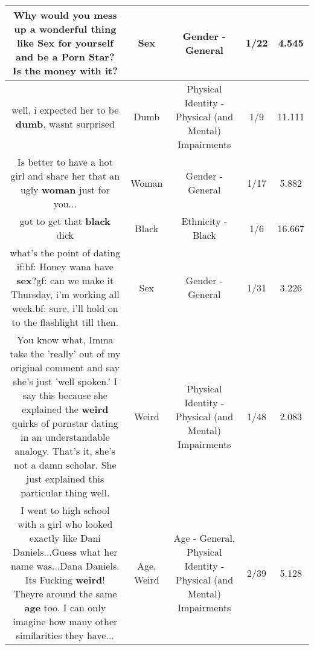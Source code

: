 \documentclass[11pt]{article}
\newlength\mylength
\begin{document}
\begin{center}
\begin{longtable}{|C{.65\mylength}|C{.30\mylength}|C{.12\mylength}|C{.12\mylength}|C{.12\mylength}|}
  \small Why would you mess up a wonderful thing like \textbf{Sex} for yourself and be a Porn Star? Is the money with it?\normalsize   & Sex & Gender - General & 1/22 & 4.545 \\  \hline
  \small well, i expected her to be \textbf{dumb}, wasnt surprised\normalsize   & Dumb & Physical Identity - Physical (and Mental) Impairments & 1/9 & 11.111 \\  \hline
  \small Is better to have a hot girl and share her that an ugly \textbf{woman} just for you...\normalsize   & Woman & Gender - General & 1/17 & 5.882 \\  \hline
  \small got to get that \textbf{black} dick\normalsize   & Black & Ethnicity - Black & 1/6 & 16.667 \\  \hline
  \small what's the point of dating if:bf: Honey wana have \textbf{sex}?gf: can we make it Thursday, i'm working all week.bf: sure, i'll hold on to the flashlight till then.\normalsize   & Sex & Gender - General & 1/31 & 3.226 \\  \hline
  \small You know what, Imma take the 'really' out of my original comment and say she's just 'well spoken.' I say this because she explained the \textbf{weird} quirks of pornstar dating in an understandable analogy. That's it, she's not a damn scholar. She just explained this particular thing well.\normalsize   & Weird & Physical Identity - Physical (and Mental) Impairments & 1/48 & 2.083 \\  \hline
  \small I went to high school with a girl who looked exactly like Dani Daniels...Guess what her name was...Dana Daniels. Its Fucking \textbf{weird}! Theyre around the same \textbf{age} too. I can only imagine how many other similarities they have...\normalsize   & Age, Weird & Age - General, Physical Identity - Physical (and Mental) Impairments & 2/39 & 5.128 \\  \hline

\end{longtable}
\end{center}
\end{document}
